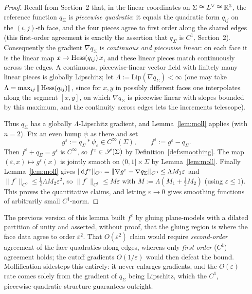 \begin{proof}
Recall from Section~2 that, in the linear coordinates on $\Sigma\cong L^{\vee}\cong\mathbb{R}^2$,
the reference function $q_\Sigma$ is \emph{piecewise quadratic}: it equals the
quadratic form $q_{ij}$ on the $(i,j)$-th face, and the four pieces agree to first
order along the shared edges (this first-order agreement is exactly the assertion
that $q_\Sigma$ is $C^1$, Section~2). Consequently the gradient $\nabla q_\Sigma$ is
\emph{continuous and piecewise linear}: on each face it is the linear map
$x\mapsto\operatorname{Hess}(q_{ij})\,x$, and these linear pieces match continuously across the
edges. A continuous, piecewise-linear vector field with finitely many linear pieces
is globally Lipschitz; let $\Lambda:=\mathrm{Lip}(\nabla q_\Sigma)<\infty$ (one may
take $\Lambda=\max_{ij}\|\operatorname{Hess}(q_{ij})\|$, since for $x,y$ in possibly different
faces one interpolates along the segment $[x,y]$, on which $\nabla q_\Sigma$ is
piecewise linear with slopes bounded by this maximum, and the continuity across
edges lets the increments telescope).

Thus $q_\Sigma$ has a globally $\Lambda$-Lipschitz gradient, and
Lemma~\ref{lem:moll} applies (with $n=2$). Fix an even bump $\psi$ as there and set
\[
g^\varepsilon:=q_\Sigma*\psi_\varepsilon\in C^\infty(\Sigma),
\qquad
f^\varepsilon:=g^\varepsilon-q_\Sigma .
\]
Then $f^\varepsilon+q_\Sigma=g^\varepsilon$ is $C^\infty$, so
$f^\varepsilon\in\mathscr S(\Sigma)$ by Definition~\ref{def:smoothing}. The map
$(\varepsilon,x)\mapsto g^\varepsilon(x)$ is jointly smooth on $(0,1]\times\Sigma$
by Lemma~\ref{lem:moll}. Finally Lemma~\ref{lem:moll} gives
$\|\mathrm d f^\varepsilon\|_{C^0}=\|\nabla g^\varepsilon-\nabla q_\Sigma\|_{C^0}
\le\Lambda M_1\varepsilon$ and
$\|f^\varepsilon\|_{C^0}\le\tfrac12\Lambda M_2\varepsilon^2$, so
$\|f^\varepsilon\|_{C^1}\le M\varepsilon$ with $M:=\Lambda(M_1+\tfrac12 M_2)$
(using $\varepsilon\le1$). This proves the quantitative claims, and letting
$\varepsilon\to0$ gives smoothing functions of arbitrarily small $C^1$-norm.
\end{proof}

\begin{qeightremark}
The previous version of this lemma built $f^\varepsilon$ by gluing
plane-models with a dilated partition of unity and asserted, without proof, that
the gluing region is where the face data agree to order $\varepsilon^2$. That
$O(\varepsilon^2)$ claim would require \emph{second-order} agreement of the face
quadratics along edges, whereas only \emph{first-order} ($C^1$) agreement holds;
the cutoff gradients $O(1/\varepsilon)$ would then defeat the bound. Mollification
sidesteps this entirely: it never enlarges gradients, and the $O(\varepsilon)$ rate
comes solely from the gradient of $q_\Sigma$ being Lipschitz, which the $C^1$,
piecewise-quadratic structure guarantees outright.
\end{qeightremark}

